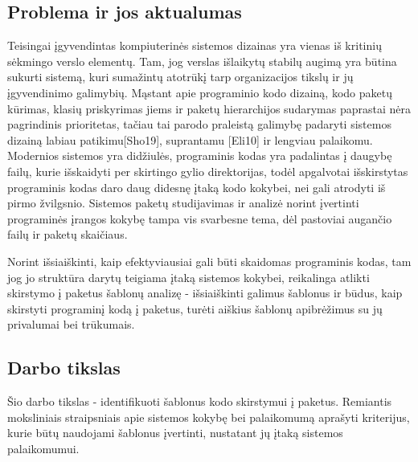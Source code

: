 \subsection{Problema ir jos aktualumas}
Teisingai įgyvendintas kompiuterinės sistemos dizainas yra vienas iš kritinių sėkmingo verslo
elementų.
Tam, jog verslas išlaikytų stabilų augimą yra būtina sukurti sistemą, kuri sumažintų
atotrūkį tarp organizacijos tikslų ir jų įgyvendinimo galimybių.
Mąstant apie programinio kodo
dizainą, kodo paketų kūrimas, klasių priskyrimas jiems ir paketų hierarchijos sudarymas paprastai
nėra pagrindinis prioritetas, tačiau tai parodo praleistą galimybę padaryti sistemos dizainą labiau
patikimu[Sho19], suprantamu [Eli10] ir lengviau palaikomu.
Modernios sistemos yra didžiulės, programinis kodas yra padalintas į daugybę failų,
kurie išskaidyti per skirtingo gylio direktorijas, todėl apgalvotai išskirstytas programinis
kodas daro daug didesnę įtaką kodo kokybei, nei gali atrodyti iš pirmo žvilgsnio.
Sistemos paketų studijavimas ir analizė norint įvertinti programinės įrangos kokybę
tampa vis svarbesne tema, dėl pastoviai augančio failų ir paketų skaičiaus\cite{DesignMetrics}.


Norint išsiaiškinti, kaip efektyviausiai gali būti skaidomas programinis
kodas, tam jog jo struktūra darytų teigiama įtaką sistemos kokybei, reikalinga atlikti skirstymo į paketus šablonų analizę -
išsiaiškinti galimus šablonus ir būdus, kaip skirstyti programinį kodą į paketus, turėti aiškius šablonų apibrėžimus su jų
privalumai bei trūkumais.

\subsection{Darbo tikslas}
Šio darbo tikslas - identifikuoti šablonus kodo skirstymui į paketus.
Remiantis moksliniais straipsniais apie sistemos kokybę bei palaikomumą aprašyti kriterijus,
kurie būtų naudojami šablonus įvertinti, nustatant jų įtaką sistemos palaikomumui.

